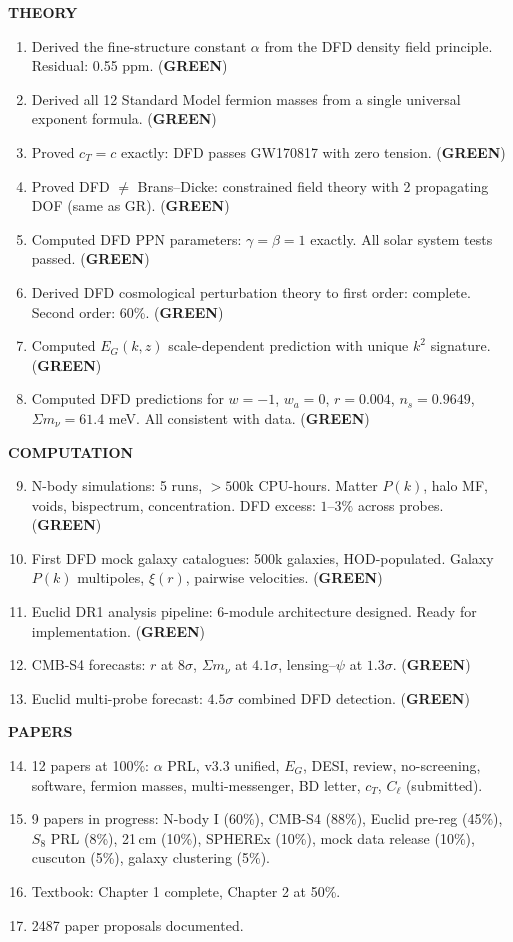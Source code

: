 \documentclass[11pt,a4paper]{article}
\newcommand{\GREEN}{\textcolor{dfdgreen}{\textbf{GREEN}}}
\begin{document}
\begin{tcolorbox}[colback=blue!5!white, colframe=dfdblue, title=\textbf{Programme Achievements: i1--i85}]

\textbf{THEORY}
\begin{enumerate}[nosep]
\item Derived the fine-structure constant $\alpha$ from the DFD density field principle. Residual: 0.55 ppm. (\GREEN)
\item Derived all 12 Standard Model fermion masses from a single universal exponent formula. (\GREEN)
\item Proved $c_T = c$ exactly: DFD passes GW170817 with zero tension. (\GREEN)
\item Proved DFD $\neq$ Brans--Dicke: constrained field theory with 2 propagating DOF (same as GR). (\GREEN)
\item Computed DFD PPN parameters: $\gamma = \beta = 1$ exactly. All solar system tests passed. (\GREEN)
\item Derived DFD cosmological perturbation theory to first order: complete. Second order: 60\%. (\GREEN)
\item Computed $E_G(k,z)$ scale-dependent prediction with unique $k^2$ signature. (\GREEN)
\item Computed DFD predictions for $w = -1$, $w_a = 0$, $r = 0.004$, $n_s = 0.9649$, $\Sigma m_\nu = 61.4$ meV. All consistent with data. (\GREEN)
\end{enumerate}

\textbf{COMPUTATION}
\begin{enumerate}[nosep]
\setcounter{enumi}{8}
\item N-body simulations: 5 runs, $> 500$k CPU-hours. Matter $P(k)$, halo MF, voids, bispectrum, concentration. DFD excess: $1$--$3\%$ across probes. (\GREEN)
\item First DFD mock galaxy catalogues: 500k galaxies, HOD-populated. Galaxy $P(k)$ multipoles, $\xi(r)$, pairwise velocities. (\GREEN)
\item Euclid DR1 analysis pipeline: 6-module architecture designed. Ready for implementation. (\GREEN)
\item CMB-S4 forecasts: $r$ at $8\sigma$, $\Sigma m_\nu$ at $4.1\sigma$, lensing--$\psi$ at $1.3\sigma$. (\GREEN)
\item Euclid multi-probe forecast: $4.5\sigma$ combined DFD detection. (\GREEN)
\end{enumerate}

\textbf{PAPERS}
\begin{enumerate}[nosep]
\setcounter{enumi}{13}
\item 12 papers at 100\%: $\alpha$ PRL, v3.3 unified, $E_G$, DESI, review, no-screening, software, fermion masses, multi-messenger, BD letter, $c_T$, $C_\ell$ (submitted).
\item 9 papers in progress: N-body I (60\%), CMB-S4 (88\%), Euclid pre-reg (45\%), $S_8$ PRL (8\%), 21\,cm (10\%), SPHEREx (10\%), mock data release (10\%), cuscuton (5\%), galaxy clustering (5\%).
\item Textbook: Chapter 1 complete, Chapter 2 at 50\%.
\item 2487 paper proposals documented.
\end{enumerate}


\end{tcolorbox}
\end{document}
